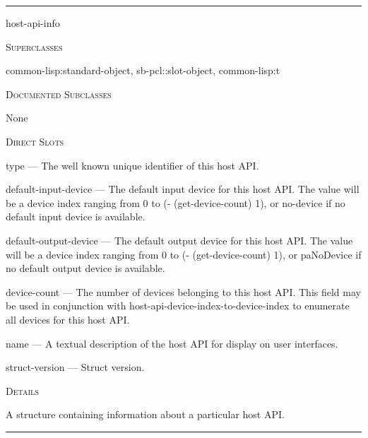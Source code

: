\documentclass[a4paper]{report}
\begin{document}
    \rule{\linewidth}{0.1mm}
    
    \label{portaudio__class__host-api-info}
    \begin{defun}[Class]
    host-api-info


      
    \bigskip
    \textsc{Superclasses}

\color[rgb]{0.5,0.5,0.5}common-lisp:standard-object\color[rgb]{0,0,0}, \color[rgb]{0.5,0.5,0.5}sb-pcl::slot-object\color[rgb]{0,0,0}, \color[rgb]{0.5,0.5,0.5}common-lisp:t\color[rgb]{0,0,0}


      
    \bigskip
    \textsc{Documented Subclasses}


	    None
	  


	
    \bigskip
    \textsc{Direct Slots}

type --- The well known unique identifier of this host API.

default-input-device --- The default input device for this host API. The value will be a device index ranging from 0 to (- (get-device-count) 1), or no-device if no default input device is available.

default-output-device --- The default output device for this host API. The value will be a device index ranging from 0 to (- (get-device-count) 1), or paNoDevice if no default output device is available.

device-count --- The number of devices belonging to this host API. This field may be used in conjunction with host-api-device-index-to-device-index to enumerate all devices for this host API.

name --- A textual description of the host API for display on user interfaces.

struct-version --- Struct version.




	
    \bigskip
    \textsc{Details}

A structure containing information about a particular host API.


    
    \end{defun}
  
  

    \rule{\linewidth}{0.1mm}
    
\end{document}
